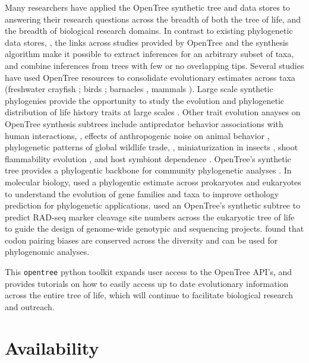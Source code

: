 \documentclass[oupdraft]{sysbio_sse}
\begin{document}
Many researchers have applied the OpenTree synthetic tree and data stores to answering their research questions across the breadth of both the tree of life, and the breadth of biological research domains.
In contrast to existing phylogenetic data stores, \citep{piel2000treebase}, the links across studies provided by OpenTree and the synthesis algorithm make it possible to extract inferences for an arbitrary subset of taxa, and combine inferences from trees with few or no overlapping tips.
Several studies have used OpenTree resources to consolidate evolutionary estimates across taxa (freshwater crayfish \citep{owen2015synthetic}; birds \citep{brown2017development}; barnacles \citep{ewers2019towards, ewers2019testing}, mammals \citep{uyeda2017evolution}).
Large scale synthetic phylogenies provide the opportunity to study the evolution and phylogenetic distribution of life history traits at large scales  \citep{tarka2018sex, healy2019animal, capdevila2020longevity}.
Other trait evolution anayses on OpenTree synthesis subtrees include antipredator behavior associations with human interactions, \citep{geffroy2020evolutionary}, effects of anthropogenic noise on
animal behavior  \citep{kunc2019effects}, phylogenetic patterns of global wildlife trade,  \citep{fukushima2020global},  miniaturization in insects \citep{polilov2017scaling},
shoot flammability evolution \citep{cui2020shoot}, and host symbiont dependence \citep{fisher2017evolution}.
OpenTree's synthetic tree provides a phylogentic backbone for community phylogenetic analyses \citep{li2019common, jantzen2019effects}.
In molecular biology, \citet{boeckmann2015quest} used a phylogentic estimate across prokaryotes and eukaryotes to understand the evolution
of gene families and taxa to improve orthology prediction for phylogenetic applications.
\citet{herrera2015predicting} used an OpenTree's synthetic subtree to predict RAD-seq marker cleavage site numbers
across the eukaryotic tree of life to guide the design of genome-wide genotypic and
sequencing projects.
\citet{miller2020codonpairs} found that codon pairing biases are conserved across the diversity and can  be used for phylogenomic analyses.


This \texttt{opentree} python toolkit expands user access to the OpenTree API's, and provides tutorials on how to easily access up to date evolutionary information across the entire tree of life, which will continue to facilitate biological research and outreach.


\section{Availability}
\label{sec6}
\end{document}
